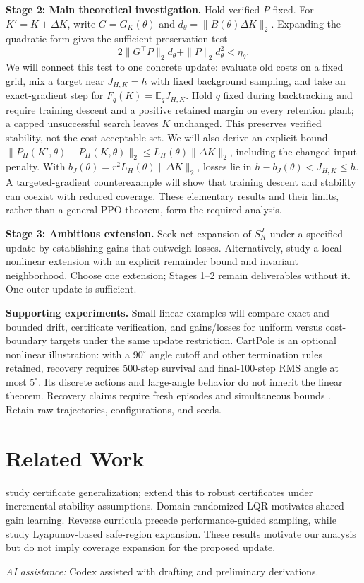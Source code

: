 \documentclass{l4dc2026}
\begin{document}
\textbf{Stage 2: Main theoretical investigation.}
Hold verified $P$ fixed. For $K'=K+\Delta K$, write $G=G_K(\theta)$ and
$d_\theta=\|B(\theta)\Delta K\|_2$. Expanding the quadratic form gives the
sufficient preservation test
\[
2\|G^\top P\|_2d_\theta+\|P\|_2d_\theta^2<\eta_\theta.
\]
We will connect this test to one concrete update: evaluate old costs on a fixed
grid, mix a target near $J_{H,K}=h$ with fixed background sampling, and take an
exact-gradient step for $F_q(K)=\mathbb E_q J_{H,K}$. Hold $q$ fixed during
backtracking and require training descent and a positive retained margin on
every retention plant; a capped unsuccessful search leaves $K$ unchanged.
This preserves verified stability, not the cost-acceptable set.
We will also derive an explicit bound
$\|P_H(K',\theta)-P_H(K,\theta)\|_2\le L_H(\theta)\|\Delta K\|_2$,
including the changed input penalty. With
$b_J(\theta)=r^2L_H(\theta)\|\Delta K\|_2$, losses lie in
$h-b_J(\theta)<J_{H,K}\le h$.
A targeted-gradient counterexample will show that training descent and stability
can coexist with reduced coverage. These elementary results and their limits,
rather than a general PPO theorem, form the required analysis.

\textbf{Stage 3: Ambitious extension.}
Seek net expansion of $S_K^J$ under a specified update by establishing gains
that outweigh losses. Alternatively, study a local nonlinear extension with
an explicit remainder bound and invariant neighborhood. Choose one extension;
Stages 1--2 remain deliverables without it. One outer update is sufficient.

\textbf{Supporting experiments.}
Small linear examples will compare exact and bounded drift, certificate
verification, and gains/losses for uniform versus cost-boundary targets under
the same update restriction. CartPole is an optional nonlinear illustration:
with a $90^\circ$ angle cutoff and other termination rules retained, recovery
requires 500-step survival and final-100-step RMS angle at most $5^\circ$.
Its discrete actions and large-angle behavior do not inherit the linear theorem.
Recovery claims require fresh episodes and simultaneous bounds
\citep{howard2021timeuniform}. Retain raw trajectories, configurations, and seeds.

\section{Related Work}

\citet{boffi2021learning} study certificate generalization;
\citet{zhang2022adversarially} extend this to robust certificates under incremental
stability assumptions. Domain-randomized LQR \citep{fujinami2025domain}
motivates shared-gain learning. Reverse curricula \citep{florensa2017reverse}
precede performance-guided sampling, while \citet{berkenkamp2017safe} study
Lyapunov-based safe-region expansion. These results motivate our analysis but
do not imply coverage expansion for the proposed update.

\noindent\textit{AI assistance:} Codex assisted with drafting and preliminary derivations.

\clearpage

\end{document}
